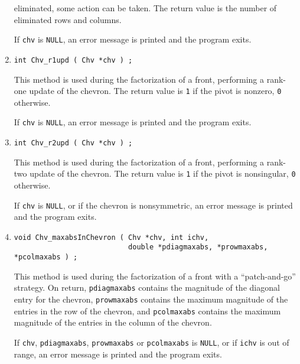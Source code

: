 \begin{enumerate}
eliminated, some action can be taken.
The return value is the number of eliminated rows and columns.
\par {}
If {\tt chv} is {\tt NULL},
an error message is printed and the program exits.
\item
\begin{verbatim}
int Chv_r1upd ( Chv *chv ) ;
\end{verbatim}
This method is used during the factorization of a front,
performing a rank-one update of the chevron.
The return value is {\tt 1} if the pivot is nonzero,
{\tt 0} otherwise.
\par {}
If {\tt chv} is {\tt NULL},
an error message is printed and the program exits.
\item
\begin{verbatim}
int Chv_r2upd ( Chv *chv ) ;
\end{verbatim}
This method is used during the factorization of a front,
performing a rank-two update of the chevron.
The return value is {\tt 1} if the pivot is nonsingular,
{\tt 0} otherwise.
\par {}
If {\tt chv} is {\tt NULL},
or if the chevron is nonsymmetric,
an error message is printed and the program exits.
\item
\begin{verbatim}
void Chv_maxabsInChevron ( Chv *chv, int ichv, 
                           double *pdiagmaxabs, *prowmaxabs, *pcolmaxabs ) ;
\end{verbatim}
This method is used during the factorization of a front
with a ``patch-and-go'' strategy.
On return, 
{\tt *pdiagmaxabs} contains the magnitude of the diagonal
entry for the chevron,
{\tt *prowmaxabs} contains the maximum magnitude of the entries
in the row of the chevron,
and {\tt *pcolmaxabs} contains the maximum magnitude of the entries
in the column of the chevron.
\par {}
If {\tt chv}, {\tt pdiagmaxabs}, {\tt prowmaxabs} or {\tt pcolmaxabs}
is {\tt NULL},
or if {\tt ichv} is out of range,
an error message is printed and the program exits.

\end{enumerate}
